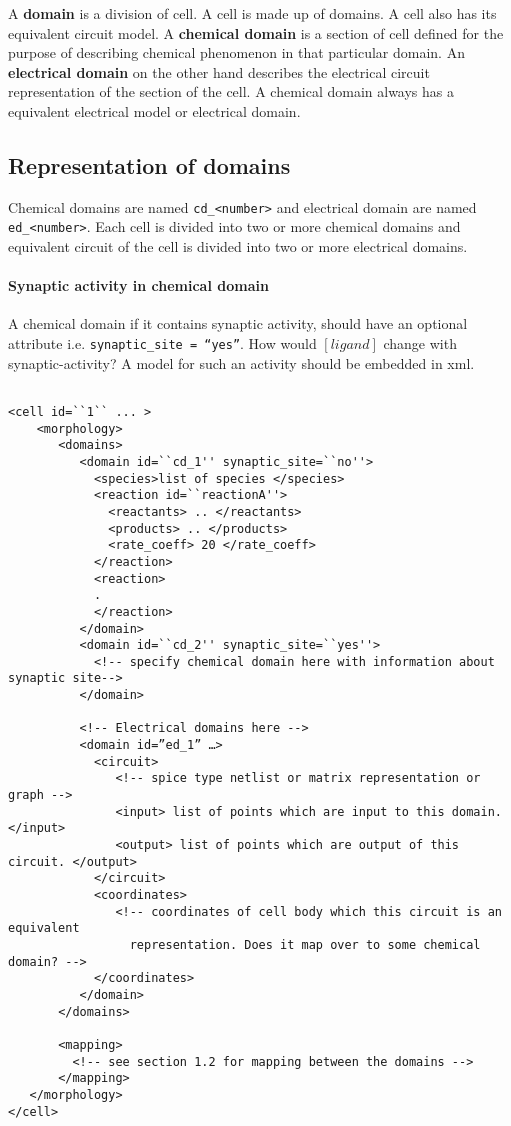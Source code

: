 A \textbf{domain} is a division of cell. A cell is made up of domains. A cell
also has its equivalent circuit model. A \textbf{chemical domain} is a section
of cell defined for the purpose of describing chemical phenomenon in that
particular domain. An \textbf{electrical domain} on the other hand describes the
electrical circuit representation of the section of the cell. A chemical
domain always has a equivalent electrical model or electrical domain. 


\subsection{Representation of domains}

Chemical domains are named \texttt{cd\_<number>} and electrical domain are named
\texttt{ed\_<number>}. Each cell is divided into two or more chemical domains and
equivalent circuit of the cell is divided into two or more electrical domains.

\paragraph{Synaptic activity in chemical domain}

 A chemical domain if it contains synaptic activity, should have an optional
 attribute i.e. \texttt{synaptic\_site = ``yes''}. How would $[ligand]$ change
 with synaptic-activity? A model for such an activity should be embedded in
 xml. 

 
\begin{verbatim}

<cell id=``1`` ... >
    <morphology>
       <domains>
          <domain id=``cd_1'' synaptic_site=``no''>
            <species>list of species </species>
            <reaction id=``reactionA''>
              <reactants> .. </reactants>
              <products> .. </products>
              <rate_coeff> 20 </rate_coeff>
            </reaction>
            <reaction>
            .
            </reaction>
          </domain>
          <domain id=``cd_2'' synaptic_site=``yes''>
            <!-- specify chemical domain here with information about synaptic site-->
          </domain>
          
          <!-- Electrical domains here -->
          <domain id=”ed_1” …>
            <circuit> 
               <!-- spice type netlist or matrix representation or graph -->
               <input> list of points which are input to this domain. </input>
               <output> list of points which are output of this circuit. </output> 
            </circuit>
            <coordinates>
               <!-- coordinates of cell body which this circuit is an equivalent 
                 representation. Does it map over to some chemical domain? -->
            </coordinates>
          </domain>
       </domains>

       <mapping> 
         <!-- see section 1.2 for mapping between the domains -->
       </mapping>
   </morphology>
</cell>
\end{verbatim}


